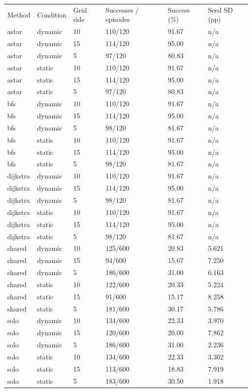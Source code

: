 \documentclass[10pt,a4paper]{article}
\begin{document}
{\footnotesize\begin{longtable}{p{}p{}p{}p{}p{}p{}}
Method & Condition & Grid side & Successes / episodes & Success (\%) & Seed SD (pp) \\
astar & dynamic & 10 & 110/120 & 91.67 & n/a \\
astar & dynamic & 15 & 114/120 & 95.00 & n/a \\
astar & dynamic & 5 & 97/120 & 80.83 & n/a \\
astar & static & 10 & 110/120 & 91.67 & n/a \\
astar & static & 15 & 114/120 & 95.00 & n/a \\
astar & static & 5 & 97/120 & 80.83 & n/a \\
bfs & dynamic & 10 & 110/120 & 91.67 & n/a \\
bfs & dynamic & 15 & 114/120 & 95.00 & n/a \\
bfs & dynamic & 5 & 98/120 & 81.67 & n/a \\
bfs & static & 10 & 110/120 & 91.67 & n/a \\
bfs & static & 15 & 114/120 & 95.00 & n/a \\
bfs & static & 5 & 98/120 & 81.67 & n/a \\
dijkstra & dynamic & 10 & 110/120 & 91.67 & n/a \\
dijkstra & dynamic & 15 & 114/120 & 95.00 & n/a \\
dijkstra & dynamic & 5 & 98/120 & 81.67 & n/a \\
dijkstra & static & 10 & 110/120 & 91.67 & n/a \\
dijkstra & static & 15 & 114/120 & 95.00 & n/a \\
dijkstra & static & 5 & 98/120 & 81.67 & n/a \\
shared & dynamic & 10 & 125/600 & 20.83 & 5.621 \\
shared & dynamic & 15 & 94/600 & 15.67 & 7.250 \\
shared & dynamic & 5 & 186/600 & 31.00 & 6.163 \\
shared & static & 10 & 122/600 & 20.33 & 5.224 \\
shared & static & 15 & 91/600 & 15.17 & 8.258 \\
shared & static & 5 & 181/600 & 30.17 & 5.786 \\
solo & dynamic & 10 & 134/600 & 22.33 & 3.970 \\
solo & dynamic & 15 & 120/600 & 20.00 & 7.862 \\
solo & dynamic & 5 & 186/600 & 31.00 & 2.236 \\
solo & static & 10 & 134/600 & 22.33 & 3.302 \\
solo & static & 15 & 113/600 & 18.83 & 7.919 \\
solo & static & 5 & 183/600 & 30.50 & 1.918 \\
\end{longtable}}
\end{document}
